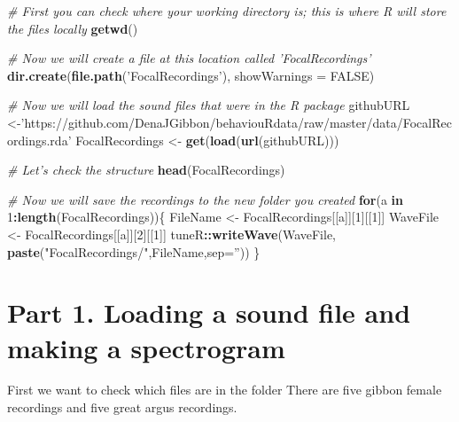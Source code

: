 \documentclass[]{book}
\newenvironment{Shaded}{\begin{snugshade}}{\end{snugshade}}
\newcommand{\CommentTok}[1]{\textcolor[rgb]{0.56,0.35,0.01}{\textit{#1}}}
\newcommand{\ControlFlowTok}[1]{\textcolor[rgb]{0.13,0.29,0.53}{\textbf{#1}}}
\newcommand{\DataTypeTok}[1]{\textcolor[rgb]{0.13,0.29,0.53}{#1}}
\newcommand{\DecValTok}[1]{\textcolor[rgb]{0.00,0.00,0.81}{#1}}
\newcommand{\KeywordTok}[1]{\textcolor[rgb]{0.13,0.29,0.53}{\textbf{#1}}}
\newcommand{\NormalTok}[1]{#1}
\newcommand{\OperatorTok}[1]{\textcolor[rgb]{0.81,0.36,0.00}{\textbf{#1}}}
\newcommand{\OtherTok}[1]{\textcolor[rgb]{0.56,0.35,0.01}{#1}}
\newcommand{\StringTok}[1]{\textcolor[rgb]{0.31,0.60,0.02}{#1}}
\begin{document}
\begin{Shaded}
\begin{Highlighting}[]
\CommentTok{# First you can check where your working directory is; this is where R will store the files locally}
\KeywordTok{getwd}\NormalTok{()}

\CommentTok{# Now we will create a file at this location called 'FocalRecordings'}
\KeywordTok{dir.create}\NormalTok{(}\KeywordTok{file.path}\NormalTok{(}\StringTok{'FocalRecordings'}\NormalTok{), }\DataTypeTok{showWarnings =} \OtherTok{FALSE}\NormalTok{)}

\CommentTok{# Now we will load the sound files that were in the R package}
\NormalTok{githubURL <-}\StringTok{'https://github.com/DenaJGibbon/behaviouRdata/raw/master/data/FocalRecordings.rda'}
\NormalTok{FocalRecordings <-}\StringTok{ }\KeywordTok{get}\NormalTok{(}\KeywordTok{load}\NormalTok{(}\KeywordTok{url}\NormalTok{(githubURL)))}

\CommentTok{# Let's check the structure}
\KeywordTok{head}\NormalTok{(FocalRecordings)}

\CommentTok{# Now we will save the recordings to the new folder you created}
\ControlFlowTok{for}\NormalTok{(a }\ControlFlowTok{in} \DecValTok{1}\OperatorTok{:}\KeywordTok{length}\NormalTok{(FocalRecordings))\{}
\NormalTok{  FileName <-}\StringTok{ }\NormalTok{FocalRecordings[[a]][}\DecValTok{1}\NormalTok{][[}\DecValTok{1}\NormalTok{]]}
\NormalTok{  WaveFile <-}\StringTok{ }\NormalTok{FocalRecordings[[a]][}\DecValTok{2}\NormalTok{][[}\DecValTok{1}\NormalTok{]]}
\NormalTok{  tuneR}\OperatorTok{::}\KeywordTok{writeWave}\NormalTok{(WaveFile, }\KeywordTok{paste}\NormalTok{(}\StringTok{"FocalRecordings/"}\NormalTok{,FileName,}\DataTypeTok{sep=}\StringTok{''}\NormalTok{))}
\NormalTok{\}}
\end{Highlighting}
\end{Shaded}

\hypertarget{part-1.-loading-a-sound-file-and-making-a-spectrogram}{%
\section*{Part 1. Loading a sound file and making a spectrogram}\label{part-1.-loading-a-sound-file-and-making-a-spectrogram}}

First we want to check which files are in the folder
There are five gibbon female recordings and five great argus recordings.
\end{document}

